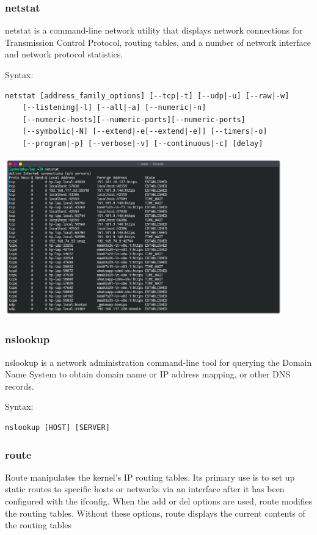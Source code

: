 \subsubsection{netstat}
netstat is a command-line network utility that displays network connections 
for Transmission Control Protocol, routing tables, and a number of network interface 
and network protocol statistics.
\linebreak[2]

Syntax:
\begin{lstlisting}
netstat [address_family_options] [--tcp|-t] [--udp|-u] [--raw|-w] 
	[--listening|-l] [--all|-a] [--numeric|-n] 
	[--numeric-hosts][--numeric-ports][--numeric-ports] 
	[--symbolic|-N] [--extend|-e[--extend|-e]] [--timers|-o] 
	[--program|-p] [--verbose|-v] [--continuous|-c] [delay]
\end{lstlisting}

\begin{center}
	\includegraphics[width=0.90\textwidth]{img/p1/ss4.png}
\end{center}


\subsubsection{nslookup}
nslookup is a network administration command-line tool for querying the 
Domain Name System to obtain domain name or IP address mapping, or other DNS records.
\linebreak[2]

Syntax:
\begin{lstlisting}
nslookup [HOST] [SERVER]
\end{lstlisting}


\subsubsection{route}
Route manipulates the kernel's IP routing tables. Its primary use is to set up static routes 
to specific hosts or networks via an interface after it has been configured with the ifconfig.
When the add or del options are used, route modifies the routing tables. Without these options, 
route displays the current contents of the routing tables
\linebreak[2]

